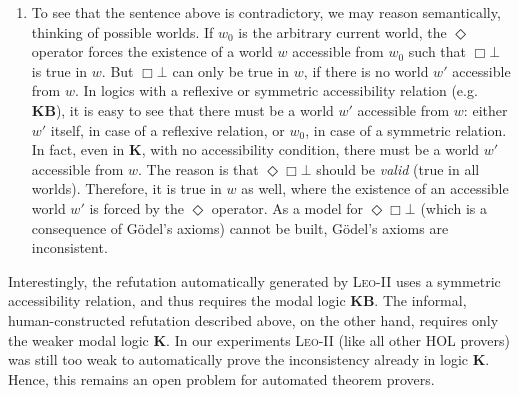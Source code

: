 \documentclass{article}
\newcommand{\logic}[1]{\textbf{#1}\xspace}
\newcommand{\KB}{\logic{KB}}
\newcommand{\K}{\logic{K}}
\newcommand{\Dia}{\Diamond} %
\newcommand{\nec}{\Box}
\newcommand{\pos}{\Dia}
\begin{document}
\begin{enumerate}
\item To see that the sentence above is contradictory, we may reason semantically, thinking of possible worlds. If $w_0$ is the arbitrary current world, the $\pos$ operator forces the existence of a world $w$ accessible from $w_0$ such that $\nec \bot$ is true in $w$. But $\nec \bot$ can only be true in $w$, if there is no world $w'$ accessible from $w$. In logics with a reflexive or symmetric accessibility relation (e.g. \KB), it is easy to see that there must be a world $w'$ accessible from $w$: either $w'$ itself, in case of a reflexive relation, or $w_0$, in case of a symmetric relation. In fact, even in \K, with no accessibility condition, there must be a world $w'$ accessible from $w$. The reason is that $\pos \nec \bot$ should be \emph{valid} (true in all worlds). Therefore, it is true in $w$ as well, where the existence of an accessible world $w'$ is forced by the $\pos$ operator. As a model for $\pos \nec \bot$ (which is a consequence of G\"odel's axioms) cannot be built, G\"odel's axioms are inconsistent.
\end{enumerate}

Interestingly, the refutation automatically generated by
\textsc{Leo-II} uses a symmetric accessibility relation, and thus
requires the modal logic \KB. The informal, human-constructed
refutation described above, on the other hand, requires only the
weaker modal logic \K. In our experiments \textsc{Leo-II} (like all
other HOL provers) was still too weak to automatically prove the
inconsistency already in logic \K. Hence, this remains an open problem for automated
theorem provers.
\end{document}
